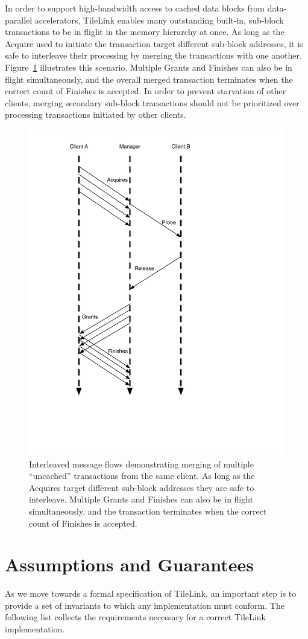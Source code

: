 In order to support high-bandwidth access to cached data blocks from data-parallel accelerators, TileLink enables many outstanding built-in, sub-block transactions
to be in flight in the memory hierarchy at once.
As long as the Acquire used to initiate the transaction target different sub-block addresses, it is safe to interleave their processing by merging the transactions with one another.
Figure~\ref{fig:acq-merge} illustrates this scenario.
Multiple Grants and Finishes can also be in flight simultaneously, and the overall merged transaction terminates when the correct count of Finishes is accepted.
In order to prevent starvation of other clients, merging secondary sub-block transactions should not be prioritized over processing transactions initiated by other clients.

\begin{figure}[t!]
\centering
\includegraphics[width=0.5\columnwidth]{tilelink/figures/acq-merge.pdf}
\caption{Interleaved message flows demonstrating merging of multiple ``uncached'' transactions from the same client.
As long as the Acquires target different sub-block addresses they are safe to interleave.
Multiple Grants and Finishes can also be in flight simultaneously, and the transaction terminates when the correct count of Finishes is accepted.}
\label{fig:acq-merge}
\end{figure}

\section{Assumptions and Guarantees}

As we move towards a formal specification of TileLink, an important step is to provide a set of invariants to which any implementation must conform.
The following list collects the requirements necessary for a correct TileLink implementation.

